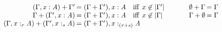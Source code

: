 \begin{definition}\label{def:contextAdd}

\begin{align*}
    \setlength{\arraycolsep}{0.1em}
    \begin{array}{cc}
    \begin{array}{rl}
    \GRANULEsym{(}  \Gamma  \GRANULEsym{,}   \GRANULEmv{x}  :  \GRANULEnt{A}   \GRANULEsym{)}  \GRANULEsym{+}  \Gamma' & = \GRANULEsym{(}  \Gamma  \GRANULEsym{+}  \Gamma'  \GRANULEsym{)}  \GRANULEsym{,}   \GRANULEmv{x}  :  \GRANULEnt{A} \quad \text{iff} \,\; x
    \not\in | \Gamma' | \\
    \Gamma  \GRANULEsym{+}  \GRANULEsym{(}  \Gamma'  \GRANULEsym{,}   \GRANULEmv{x}  :  \GRANULEnt{A}   \GRANULEsym{)} & = \GRANULEsym{(}  \Gamma  \GRANULEsym{+}  \Gamma'  \GRANULEsym{)}  \GRANULEsym{,}   \GRANULEmv{x}  :  \GRANULEnt{A} \quad \text{iff} \,\; x \not\in | \Gamma | \\
    \GRANULEsym{(}  \Gamma  \GRANULEsym{,}   \GRANULEmv{x}  :_{\textcolor{coeffectColor}{  \GRANULEnt{r}  } }   \GRANULEnt{A}   \GRANULEsym{)}  \GRANULEsym{+}  \GRANULEsym{(}  \Gamma'  \GRANULEsym{,}   \GRANULEmv{x}  :_{\textcolor{coeffectColor}{  \GRANULEnt{s}  } }   \GRANULEnt{A}   \GRANULEsym{)} & = \GRANULEsym{(}  \Gamma  \GRANULEsym{+}  \Gamma'  \GRANULEsym{)}  \GRANULEsym{,}   \GRANULEmv{x}  :_{\textcolor{coeffectColor}{  \GRANULEsym{(}  \GRANULEnt{r}  \GRANULEsym{+}  \GRANULEnt{s}  \GRANULEsym{)}  } }   \GRANULEnt{A}
    \end{array}
      \;\;\quad & \quad\;\;
    \begin{array}{rl}
      \emptyset   \GRANULEsym{+}  \Gamma & = \Gamma \\
      \Gamma  \GRANULEsym{+}   \emptyset & = \Gamma \\ \\
    \end{array}
  \end{array}
  \end{align*}


\end{definition}
